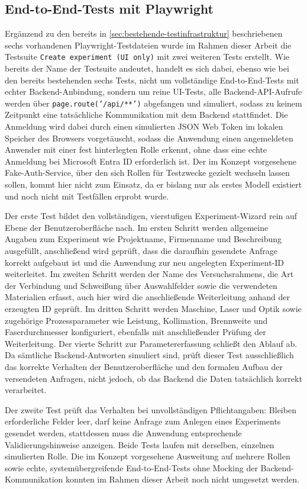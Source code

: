 \subsection{End-to-End-Tests mit Playwright}
Ergänzend zu den bereits in \autoref{sec:bestehende-testinfrastruktur} beschriebenen sechs vorhandenen Playwright-Testdateien wurde im Rahmen dieser Arbeit die Testsuite \texttt{Create experiment (UI only)} mit zwei weiteren Tests erstellt. Wie bereits der Name der Testsuite andeutet, handelt es sich dabei, ebenso wie bei den bereits bestehenden sechs Tests, nicht um vollständige End-to-End-Tests mit echter Backend-Anbindung, sondern um reine UI-Tests, alle Backend-API-Aufrufe werden über \texttt{page.route('/api/**')} abgefangen und simuliert, sodass zu keinem Zeitpunkt eine tatsächliche Kommunikation mit dem Backend stattfindet. Die Anmeldung wird dabei durch einen simulierten JSON Web Token im lokalen Speicher des Browsers vorgetäuscht, sodass die Anwendung einen angemeldeten Anwender mit einer fest hinterlegten Rolle erkennt, ohne dass eine echte Anmeldung bei Microsoft Entra ID erforderlich ist. Der im Konzept vorgesehene Fake-Auth-Service, über den sich Rollen für Testzwecke gezielt wechseln lassen sollen, kommt hier nicht zum Einsatz, da er bislang nur als erstes Modell existiert und noch nicht mit Testfällen erprobt wurde.

Der erste Test bildet den vollständigen, vierstufigen Experiment-Wizard rein auf Ebene der Benutzeroberfläche nach. Im ersten Schritt werden allgemeine Angaben zum Experiment wie Projektname, Firmenname und Beschreibung ausgefüllt, anschließend wird geprüft, dass die daraufhin gesendete Anfrage korrekt aufgebaut ist und die Anwendung zur neu angelegten Experiment-ID weiterleitet. Im zweiten Schritt werden der Name des Versuchsrahmens, die Art der Verbindung und Schweißung über Auswahlfelder sowie die verwendeten Materialien erfasst, auch hier wird die anschließende Weiterleitung anhand der erzeugten ID geprüft. Im dritten Schritt werden Maschine, Laser und Optik sowie zugehörige Prozessparameter wie Leistung, Kollimation, Brennweite und Faserdurchmesser konfiguriert, ebenfalls mit anschließender Prüfung der Weiterleitung. Der vierte Schritt zur Parametererfassung schließt den Ablauf ab. Da sämtliche Backend-Antworten simuliert sind, prüft dieser Test ausschließlich das korrekte Verhalten der Benutzeroberfläche und den formalen Aufbau der versendeten Anfragen, nicht jedoch, ob das Backend die Daten tatsächlich korrekt verarbeitet.

Der zweite Test prüft das Verhalten bei unvollständigen Pflichtangaben: Bleiben erforderliche Felder leer, darf keine Anfrage zum Anlegen eines Experiments gesendet werden, stattdessen muss die Anwendung entsprechende Validierungshinweise anzeigen. Beide Tests laufen mit derselben, einzelnen simulierten Rolle. Die im Konzept vorgesehene Ausweitung auf mehrere Rollen sowie echte, systemübergreifende End-to-End-Tests ohne Mocking der Backend-Kommunikation konnten im Rahmen dieser Arbeit noch nicht umgesetzt werden.


